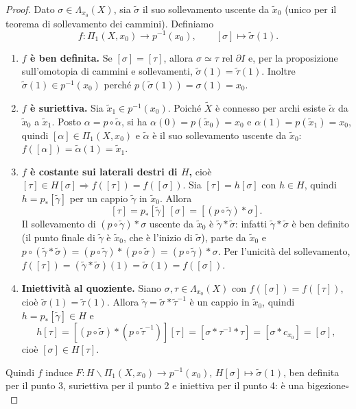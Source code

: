 \begin{proof}
Dato $\sigma \in \Lambda_{x_0}(X)$, sia $\widetilde{\sigma}$ il suo sollevamento uscente da $\widetilde{x}_0$ (unico per il teorema di sollevamento dei cammini). Definiamo
\[
f: \Pi_1(X, x_0) \to p^{-1}(x_0), \qquad [\sigma] \mapsto \widetilde{\sigma}(1).
\]
\begin{enumerate}
    \item \textbf{$f$ \`e ben definita.} Se $[\sigma] = [\tau]$, allora $\sigma \simeq \tau$ rel $\partial I$ e, per la proposizione sull'omotopia di cammini e sollevamenti, $\widetilde{\sigma}(1) = \widetilde{\tau}(1)$. Inoltre $\widetilde{\sigma}(1) \in p^{-1}(x_0)$ perch\'e $p(\widetilde{\sigma}(1)) = \sigma(1) = x_0$.
    \item \textbf{$f$ \`e suriettiva.} Sia $\widetilde{x}_1 \in p^{-1}(x_0)$. Poich\'e $\widetilde{X}$ \`e connesso per archi esiste $\widetilde{\alpha}$ da $\widetilde{x}_0$ a $\widetilde{x}_1$. Posto $\alpha = p \circ \widetilde{\alpha}$, si ha $\alpha(0) = p(\widetilde{x}_0) = x_0$ e $\alpha(1) = p(\widetilde{x}_1) = x_0$, quindi $[\alpha] \in \Pi_1(X, x_0)$ e $\widetilde{\alpha}$ \`e il suo sollevamento uscente da $\widetilde{x}_0$: $f([\alpha]) = \widetilde{\alpha}(1) = \widetilde{x}_1$.
    \item \textbf{$f$ \`e costante sui laterali destri di $H$,} cio\`e $[\tau] \in H[\sigma] \Rightarrow f([\tau]) = f([\sigma])$. Sia $[\tau] = h[\sigma]$ con $h \in H$, quindi $h = p_*[\widetilde{\gamma}]$ per un cappio $\widetilde{\gamma}$ in $\widetilde{x}_0$. Allora
    \[
    [\tau] = p_*[\widetilde{\gamma}]\,[\sigma] = [(p \circ \widetilde{\gamma}) * \sigma].
    \]
    Il sollevamento di $(p \circ \widetilde{\gamma}) * \sigma$ uscente da $\widetilde{x}_0$ \`e $\widetilde{\gamma} * \widetilde{\sigma}$: infatti $\widetilde{\gamma} * \widetilde{\sigma}$ \`e ben definito (il punto finale di $\widetilde{\gamma}$ \`e $\widetilde{x}_0$, che \`e l'inizio di $\widetilde{\sigma}$), parte da $\widetilde{x}_0$ e $p \circ (\widetilde{\gamma} * \widetilde{\sigma}) = (p\circ\widetilde{\gamma}) * (p \circ \widetilde{\sigma}) = (p \circ \widetilde{\gamma}) * \sigma$. Per l'unicit\`a del sollevamento, $f([\tau]) = (\widetilde{\gamma} * \widetilde{\sigma})(1) = \widetilde{\sigma}(1) = f([\sigma])$.
    \item \textbf{Iniettivit\`a al quoziente.} Siano $\sigma, \tau \in \Lambda_{x_0}(X)$ con $f([\sigma]) = f([\tau])$, cio\`e $\widetilde{\sigma}(1) = \widetilde{\tau}(1)$. Allora $\widetilde{\gamma} = \widetilde{\sigma} * \widetilde{\tau}^{-1}$ \`e un cappio in $\widetilde{x}_0$, quindi $h = p_*[\widetilde{\gamma}] \in H$ e
    \[
    h[\tau] = [(p \circ \widetilde{\sigma}) * (p \circ \widetilde{\tau}^{-1})][\tau] = [\sigma * \tau^{-1} * \tau] = [\sigma * c_{x_0}] = [\sigma],
    \]
    cio\`e $[\sigma] \in H[\tau]$.
\end{enumerate}
Quindi $f$ induce $F: H\backslash \Pi_1(X, x_0) \to p^{-1}(x_0)$, $H[\sigma] \mapsto \widetilde{\sigma}(1)$, ben definita per il punto 3, suriettiva per il punto 2 e iniettiva per il punto 4: \`e una bigezione\hfill$\square$
\end{proof}

